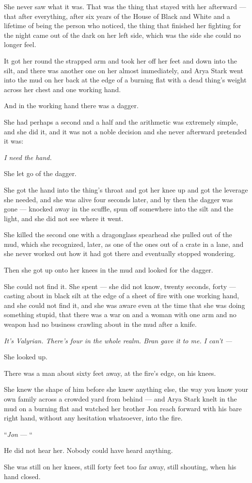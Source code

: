 She never saw what it was. That was the thing that stayed with her afterward — that after everything, after six years of the House of Black and White and a lifetime of being the person who noticed, the thing that finished her fighting for the night came out of the dark on her left side, which was the side she could no longer feel.

It got her round the strapped arm and took her off her feet and down into the silt, and there was another one on her almost immediately, and Arya Stark went into the mud on her back at the edge of a burning flat with a dead thing’s weight across her chest and one working hand.

And in the working hand there was a dagger.

She had perhaps a second and a half and the arithmetic was extremely simple, and she did it, and it was not a noble decision and she never afterward pretended it was:

\textit{I need the hand.}

She let go of the dagger.

She got the hand into the thing’s throat and got her knee up and got the leverage she needed, and she was alive four seconds later, and by then the dagger was gone — knocked away in the scuffle, spun off somewhere into the silt and the light, and she did not see where it went.

She killed the second one with a dragonglass spearhead she pulled out of the mud, which she recognized, later, as one of the ones out of a crate in a lane, and she never worked out how it had got there and eventually stopped wondering.

Then she got up onto her knees in the mud and looked for the dagger.

She could not find it. She spent — she did not know, twenty seconds, forty — casting about in black silt at the edge of a sheet of fire with one working hand, and she could not find it, and she was aware even at the time that she was doing something stupid, that there was a war on and a woman with one arm and no weapon had no business crawling about in the mud after a knife.

\textit{It’s Valyrian. There’s four in the whole realm. Bran gave it to me. I can’t — }

She looked up.

There was a man about sixty feet away, at the fire’s edge, on his knees.

She knew the shape of him before she knew anything else, the way you know your own family across a crowded yard from behind — and Arya Stark knelt in the mud on a burning flat and watched her brother Jon reach forward with his bare right hand, without any hesitation whatsoever, into the fire.

“\textit{Jon} — “

He did not hear her. Nobody could have heard anything.

She was still on her knees, still forty feet too far away, still shouting, when his hand closed.